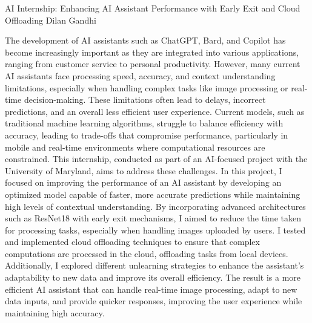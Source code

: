 ﻿AI Internship: Enhancing AI Assistant Performance with Early Exit and Cloud Offloading
Dilan Gandhi


        The development of AI assistants such as ChatGPT, Bard, and Copilot has become increasingly important as they are integrated into various applications, ranging from customer service to personal productivity. However, many current AI assistants face processing speed, accuracy, and context understanding limitations, especially when handling complex tasks like image processing or real-time decision-making. These limitations often lead to delays, incorrect predictions, and an overall less efficient user experience. Current models, such as traditional machine learning algorithms, struggle to balance efficiency with accuracy, leading to trade-offs that compromise performance, particularly in mobile and real-time environments where computational resources are constrained. This internship, conducted as part of an AI-focused project with the University of Maryland, aims to address these challenges.
        In this project, I focused on improving the performance of an AI assistant by developing an optimized model capable of faster, more accurate predictions while maintaining high levels of contextual understanding. By incorporating advanced architectures such as ResNet18 with early exit mechanisms, I aimed to reduce the time taken for processing tasks, especially when handling images uploaded by users. I tested and implemented cloud offloading techniques to ensure that complex computations are processed in the cloud, offloading tasks from local devices. Additionally, I explored different unlearning strategies to enhance the assistant's adaptability to new data and improve its overall efficiency. The result is a more efficient AI assistant that can handle real-time image processing, adapt to new data inputs, and provide quicker responses, improving the user experience while maintaining high accuracy.